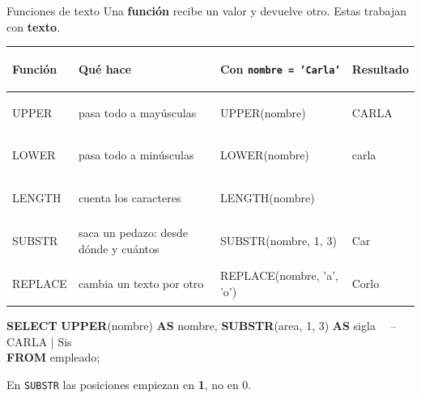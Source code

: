 \documentclass[aspectratio=169,10pt,c]{beamer}
\newcommand{\kw}[1]{\textcolor{utpRojo}{\textbf{#1}}}
\newcommand{\com}[1]{\textcolor{utpGris}{-- #1}}
\newenvironment{sqlcode}[1][.86\textwidth]
  {\begin{center}\begin{lrbox}{\sqlbuf}\begin{minipage}{#1}\ttfamily\footnotesize\vspace{6pt}\raggedright}
  {\vspace{6pt}\end{minipage}\end{lrbox}\colorbox{utpGrisClaro}{\usebox{\sqlbuf}}\end{center}}
\begin{document}
\begin{frame}{Funciones de texto}
\small Una \textbf{función} recibe un valor y devuelve otro. Estas trabajan con \textbf{texto}.
\begin{center}
\small
\renewcommand{\arraystretch}{1.3}
\begin{tabular}{>{\ttfamily\bfseries\raggedright\arraybackslash}p{1.7cm}>{\raggedright\arraybackslash}p{4.3cm}>{\ttfamily\raggedright\arraybackslash}p{4.7cm}>{\ttfamily\raggedright\arraybackslash}p{1.5cm}}
\toprule
\normalfont\bfseries Función & \bfseries Qué hace & \normalfont\bfseries Con \texttt{nombre = 'Carla'} & \normalfont\bfseries Resultado \\
\midrule
UPPER & pasa todo a mayúsculas & UPPER(nombre) & CARLA \\
LOWER & pasa todo a minúsculas & LOWER(nombre) & carla \\
LENGTH & cuenta los caracteres & LENGTH(nombre) & 5 \\
SUBSTR & saca un pedazo: desde dónde y cuántos & SUBSTR(nombre, 1, 3) & Car \\
REPLACE & cambia un texto por otro & REPLACE(nombre, 'a', 'o') & Corlo \\
\bottomrule
\end{tabular}
\end{center}
\vspace{-0.1cm}
\begin{sqlcode}[.80\textwidth]
\scriptsize
\kw{SELECT} \kw{UPPER}(nombre) \kw{AS} nombre, \kw{SUBSTR}(area, 1, 3) \kw{AS} sigla \ \ \com{CARLA | Sis}\\
\kw{FROM} empleado;
\end{sqlcode}
\vspace{-0.1cm}
\small En \texttt{SUBSTR} las posiciones empiezan en \textbf{1}, no en 0.
\end{frame}
\end{document}
